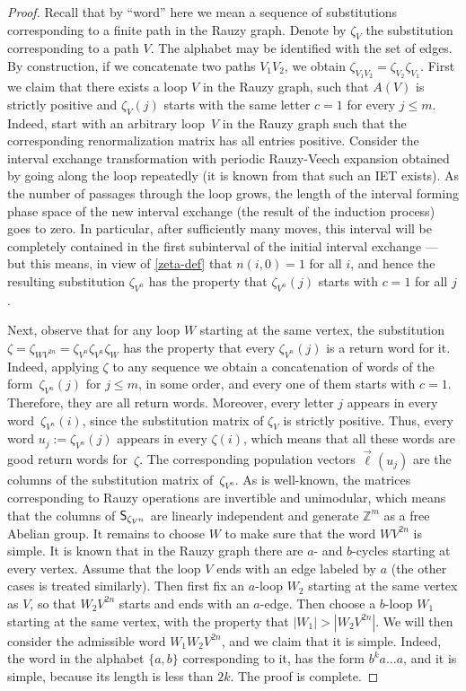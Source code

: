 \documentclass[10pt]{amsart}
\theoremstyle{plain}
\theoremstyle{definition}
\newcommand{\Z}{\mathbb{Z}}
\newcommand\Sf{{\sf S}}
\begin{document}
\begin{proof}
Recall that by ``word'' here we mean a sequence of substitutions corresponding to a finite path in the Rauzy graph. Denote by $\zeta_V$ the substitution corresponding to a path $V$.
The
alphabet may be identified with the set of edges. By construction, if we concatenate two paths $V_1 V_2$, we obtain
$
\zeta_{V_1 V_2} = \zeta_{V_2} \zeta_{V_1}.
$
First we claim that there exists a loop $V$ in the Rauzy graph, such that $A(V)$ is strictly positive and $\zeta_V(j)$ starts with the same letter $c=1$ for every $j\le m$.
Indeed, start with an arbitrary loop~$V$ in the Rauzy graph such that the corresponding renormalization matrix has all entries positive. Consider the interval exchange transformation with periodic
Rauzy-Veech expansion obtained by going along the loop repeatedly (it is known from \cite{veech} that such an IET exists).
As the number of passages through the loop grows, the length of the interval forming phase space of the new interval exchange (the result of the induction process) goes to zero. In particular, after sufficiently many moves, this interval will be completely contained in the first subinterval of the initial interval exchange --- but this means, in view of \eqref{zeta-def} that $n(i,0)=1$ for all $i$, and hence the resulting substitution
$\zeta_{V^n}$
has the property that
$\zeta_{V^n}(j)$
starts with $c=1$ for all $j$.\enlargethispage{.5\baselineskip}%

Next, observe that for any loop $W$ starting at the same vertex, the substitution
$\zeta=
\zeta_{WV^{2n}} = \zeta_{V^n}\zeta_{V^n}\zeta_W$ has the property that every $\zeta_{V^n}(j)$ is a return word for it. Indeed, applying $\zeta$ to any sequence we obtain a concatenation of words of the form~$\zeta_{V^n}(j)$ for $j\le m$, in some order, and every one of them starts with $c=1$. Therefore, they are all return words. Moreover, every letter $j$ appears in every
word~$\zeta_{V^n}(i)$, since the substitution matrix of $\zeta_V$ is strictly positive. Thus,
every word $u_j:=
\zeta_{V^n}(j)$ appears in every $\zeta(i)$, which means that all these words are good return words for~$\zeta$. The corresponding population vectors
$\vec\ell(u_j)$ are the columns of the substitution matrix of~$\zeta_{V^n}$. As is well-known, the matrices corresponding to Rauzy operations are invertible and unimodular, which means that the columns of $\Sf_{\zeta_{V^n}}$ are linearly independent and generate $\Z^m$ as a free Abelian group.
It remains to choose $W$ to make sure that the word $WV^{2n}$ is simple. It is known that in the Rauzy graph there are $a$- and $b$-cycles starting at every vertex. Assume that the loop $V$ ends with an edge labeled by $a$ (the other cases is treated similarly). Then first fix an $a$-loop $W_2$ starting at the same vertex as $V$, so that $W_2 V^{2n}$ starts and ends with an $a$-edge. Then choose a $b$-loop $W_1$ starting at the same vertex, with the property that
$|W_1|> |W_2 V^{2n}|$. We will then consider the admissible word $W_1 W_2 V^{2n}$, and we claim that it is simple. Indeed, the word in the alphabet $\{a,b\}$ corresponding to it, has the form $b^k a\ldots a$, and it is simple, because its length is less than $2k$. The proof is complete.
\end{proof}
\end{document}
